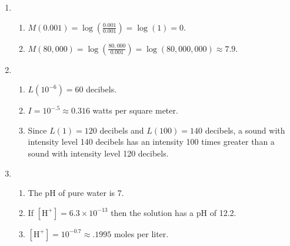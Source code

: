 \begin{enumerate}
\setcounter{enumi}{\value{HW}}


\item \begin{enumerate}

\item $M(0.001) = \log \left(\frac{0.001}{0.001} \right) = \log(1) = 0$.
\item $M(80,000) = \log \left(\frac{80,000}{0.001} \right) = \log(80,000,000) \approx 7.9$.

\end{enumerate}

\item \begin{enumerate}

\item $L(10^{-6}) = 60$ decibels.
\item $I = 10^{-.5} \approx 0.316$ watts per square meter.
\item Since $L(1) = 120$ decibels and $L(100) = 140$ decibels, a sound with intensity level 140 decibels has an intensity 100 times greater than a sound with intensity level 120 decibels.

\end{enumerate}

\item \begin{enumerate}

\item The pH of pure water is 7.
\item If $[\mbox{H}^{+}] = 6.3 \times 10^{-13}$ then the solution has a pH of 12.2.
\item $[\mbox{H}^{+}] = 10^{-0.7} \approx .1995$ moles per liter.

\end{enumerate}

\end{enumerate}

\closegraphsfile